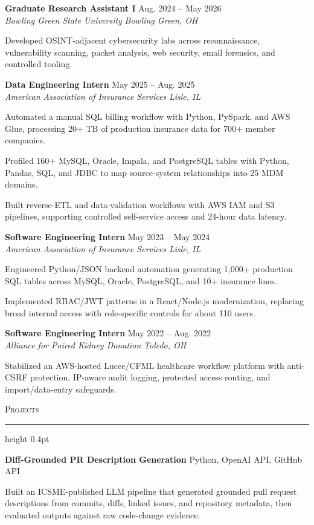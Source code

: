 \documentclass[letterpaper,11pt]{article}
\newcommand{\resumesection}[1]{%
  \par\vspace{2pt}%
  {\large\scshape #1}\par\vspace{2pt}%
  \hrule height 0.4pt\vspace{2pt}%
}
\newcommand{\resumeSubheading}[4]{
  \textbf{#1} \hfill #2\\
  \textit{#3} \hfill \textit{#4}
}
\newcommand{\projectHeading}[2]{
  \textbf{#1} \hfill #2
}
\begin{document}
\resumeSubheading
{Graduate Research Assistant I}{Aug. 2024 -- May 2026}
{Bowling Green State University}{Bowling Green, OH}
\begin{tightitemize}
  \item Developed OSINT-adjacent cybersecurity labs across reconnaissance, vulnerability scanning, packet analysis, web security, email forensics, and controlled tooling.
\end{tightitemize}

\resumeSubheading
{Data Engineering Intern}{May 2025 -- Aug. 2025}
{American Association of Insurance Services}{Lisle, IL}
\begin{tightitemize}
  \item Automated a manual SQL billing workflow with Python, PySpark, and AWS Glue, processing 20+ TB of production insurance data for 700+ member companies.
  \item Profiled 160+ MySQL, Oracle, Impala, and PostgreSQL tables with Python, Pandas, SQL, and JDBC to map source-system relationships into 25 MDM domains.
  \item Built reverse-ETL and data-validation workflows with AWS IAM and S3 pipelines, supporting controlled self-service access and 24-hour data latency.
\end{tightitemize}

\resumeSubheading
{Software Engineering Intern}{May 2023 -- May 2024}
{American Association of Insurance Services}{Lisle, IL}
\begin{tightitemize}
  \item Engineered Python/JSON backend automation generating 1,000+ production SQL tables across MySQL, Oracle, PostgreSQL, and 10+ insurance lines.
  \item Implemented RBAC/JWT patterns in a React/Node.js modernization, replacing broad internal access with role-specific controls for about 110 users.
\end{tightitemize}

\resumeSubheading
{Software Engineering Intern}{May 2022 -- Aug. 2022}
{Alliance for Paired Kidney Donation}{Toledo, OH}
\begin{tightitemize}
  \item Stabilized an AWS-hosted Lucee/CFML healthcare workflow platform with anti-CSRF protection, IP-aware audit logging, protected access routing, and import/data-entry safeguards.
\end{tightitemize}

\resumesection{Projects}
\projectHeading{Diff-Grounded PR Description Generation}{Python, OpenAI API, GitHub API}
\begin{tightitemize}
  \item Built an ICSME-published LLM pipeline that generated grounded pull request descriptions from commits, diffs, linked issues, and repository metadata, then evaluated outputs against raw code-change evidence.
\end{tightitemize}
\end{document}
